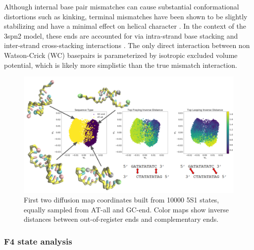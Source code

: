 \documentclass[journal=jpcbfk,manuscript=article]{achemso}
\begin{document}
Although internal base pair mismatches can cause substantial conformational distortions such as kinking, terminal mismatches have been shown to be slightly stabilizing and have a minimal effect on helical character \citep{Santalucia2004TM, DiMichele2014EffectHybridization}. In the context of the 3spn2 model, these ends are accounted for via intra-strand base stacking and inter-strand cross-stacking interactions \citep{Hinckley2013AnHybridization}. The only direct interaction between non Watson-Crick (WC) basepairs is parameterized by isotropic excluded volume potential, which is likely more simplistic than the true mismatch interaction. 


\begin{figure}[ht!]
	\begin{center}
        \includegraphics[width=\textwidth]{Figs/figs_imp/GC-end_dmaps.PNG}
        \caption{First two diffusion map coordinates built from 10000 5S1 states, equally sampled from AT-all and GC-end. Color maps show inverse distances between out-of-register ends and complementary ends.}
        \label{fig:GC-end_dmaps}
	\end{center}
\end{figure}


\subsubsection{F4 state analysis}  %
\end{document}

